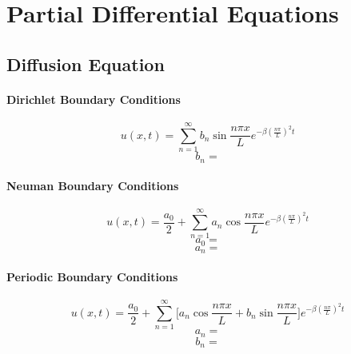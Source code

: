 \chapter{Partial Differential Equations}


\section{Diffusion Equation}
\subsubsection{Dirichlet Boundary Conditions}
\begin{equation}
    u(x,t) = \sum_{n=1}^\infty b_n \sin{\frac{n\pi x}{L}} e^{-\beta (\frac{n\pi}{L})^2 t}
\end{equation}
\begin{equation}
    b_n = %
\end{equation}

\subsubsection{Neuman Boundary Conditions}
\begin{equation}
    u(x,t) = \frac{a_0}{2} + \sum_{n=1}^\infty a_n \cos{\frac{n\pi x}{L}} e^{-\beta (\frac{n\pi}{L})^2 t}
\end{equation}
\begin{equation}
    a_0 = %
\end{equation}
\begin{equation}
    a_n = %
\end{equation}

\subsubsection{Periodic Boundary Conditions}
\begin{equation}
    u(x,t) = \frac{a_0}{2} + \sum_{n=1}^\infty \Big[a_n \cos{\frac{n\pi x}{L}} + b_n \sin{\frac{n\pi x}{L}} \Big] e^{-\beta (\frac{n\pi}{L})^2 t}
\end{equation}
\begin{equation}
    a_n = %
\end{equation}
\begin{equation}
    b_n = %
\end{equation}


